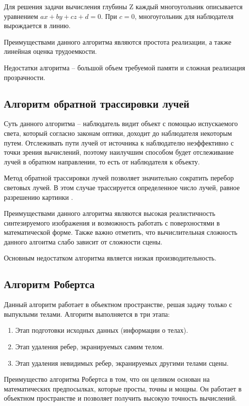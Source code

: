 Для решения задачи вычисления глубины Z каждый многоугольник
описывается уравнением $ax + by + cz + d = 0$. При $c = 0$, многоугольник для
наблюдателя вырождается в линию.

Преимуществами данного алгоритма являются простота реализации, а также линейная оценка трудоемкости.

Недостатки алгоритма -- большой объем требуемой памяти и сложная реализация прозрачности.

\subsection{Алгоритм обратной трассировки лучей} 
Суть данного алгоритма -- наблюдатель видит объект с помощью испускаемого света, который согласно законам оптики, доходит до наблюдателя некоторым путем.
Отслеживать пути лучей от источника к наблюдателю неэффективно с точки зрения вычислений, поэтому наилучшим способом будет отслеживание лучей в обратном направлении, то есть от наблюдателя к объекту.

Метод обратной трассировки лучей позволяет значительно сократить перебор световых лучей. В этом случае трассируется определенное число лучей, равное разрешению картинки \cite{raytrace}.

Преимуществами данного алгоритма являются высокая реалистичность синтезируемого изображения и возможность работать с поверхностями в математической форме. Также важно отметить, что вычислительная сложность данного алгоитма слабо зависит от сложности сцены.

Основным недостатком алгоритма является низкая производительность.

\subsection{Алгоритм Робертса}
Данный алгоритм работает в объектном пространстве, решая задачу
только с выпуклыми телами. \cite{roberts} 
\newpage
Алгоритм выполняется в три этапа:
\begin{enumerate}
    \item Этап подготовки исходных данных (информации о телах).
    \item Этап удаления ребер, экранируемых самим телом.
    \item Этап удаления невидимых ребер, экранируемых другими телами
сцены.
\end{enumerate}

Преимущество алгоритма Робертса в том, что он целиком основан на математических предпосылках, которые просты, точны и мощны. Он работает в объектном пространстве и позволяет получить высокую точность вычислений.

